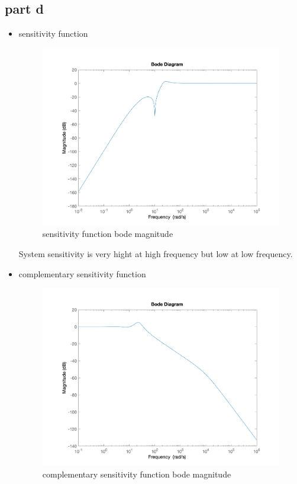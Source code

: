 \subsection{part d}
\begin{itemize}
    \item sensitivity function
    \begin{figure}[H]
        \caption{sensitivity function bode magnitude}
        \centering
        \includegraphics[width=12cm]{../Figure/Q1/Q1_d/sensitivity_func.png}
    \end{figure}
    System sensitivity is very hight at high frequency but low at low frequency.
    \item complementary sensitivity function 
    \begin{figure}[H]
        \caption{complementary sensitivity function bode magnitude}
        \centering
        \includegraphics[width=12cm]{../Figure/Q1/Q1_d/com_sensitivity_func.png}

\end{figure}
\end{itemize}
